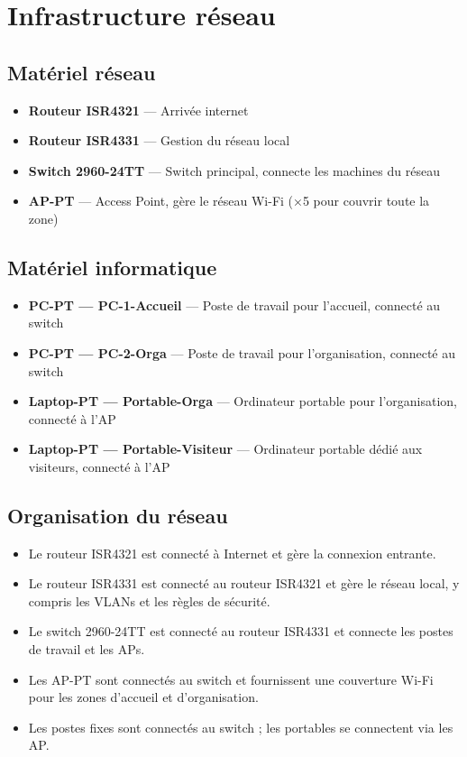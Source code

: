 \documentclass[a4paper,12pt]{article}
\begin{document}
\section{Infrastructure réseau}

\subsection{Matériel réseau}

\begin{itemize}
  \item \textbf{Routeur ISR4321} — Arrivée internet
  \item \textbf{Routeur ISR4331} — Gestion du réseau local
  \item \textbf{Switch 2960-24TT} — Switch principal, connecte les machines du réseau
  \item \textbf{AP-PT} — Access Point, gère le réseau Wi-Fi (×5 pour couvrir toute la zone)
\end{itemize}

\subsection{Matériel informatique}

\begin{itemize}
  \item \textbf{PC-PT — PC-1-Accueil} — Poste de travail pour l'accueil, connecté au switch
  \item \textbf{PC-PT — PC-2-Orga} — Poste de travail pour l'organisation, connecté au switch
  \item \textbf{Laptop-PT — Portable-Orga} — Ordinateur portable pour l'organisation, connecté à l'AP
  \item \textbf{Laptop-PT — Portable-Visiteur} — Ordinateur portable dédié aux visiteurs, connecté à l'AP
\end{itemize}

\subsection{Organisation du réseau}

\begin{itemize}
  \item Le routeur ISR4321 est connecté à Internet et gère la connexion entrante.
  \item Le routeur ISR4331 est connecté au routeur ISR4321 et gère le réseau local, y compris les VLANs et les règles de sécurité.
  \item Le switch 2960-24TT est connecté au routeur ISR4331 et connecte les postes de travail et les APs.
  \item Les AP-PT sont connectés au switch et fournissent une couverture Wi-Fi pour les zones d'accueil et d'organisation.
  \item Les postes fixes sont connectés au switch ; les portables se connectent via les AP.
\end{itemize}
\end{document}
